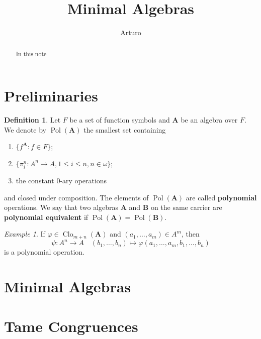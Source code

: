 \documentclass{amsart}
\theoremstyle{plain}
\theoremstyle{definition}
\newtheorem{definition}[theorem]{Definition}
\theoremstyle{remark}
\newtheorem{example}[theorem]{Example}
\def\phi{\varphi}
\DeclareMathOperator{\Clo}{Clo}
\DeclareMathOperator{\Pol}{Pol}
\begin{document}
\title{Minimal Algebras}
\author{Arturo}


\begin{abstract}
   In this note 
\end{abstract}

\maketitle 

\section{Preliminaries} 
\begin{definition}
    Let $F$ be a set of function symbols and $\mathbf{A}$ be an algebra over $F$. 
    We denote by $\Pol(\mathbf{A})$ the smallest set containing 
    \begin{enumerate}
        \item $\{f^\mathbf{A}: f \in F\}$; 
        \item $\{\pi^n_i: A^n \to A, 1 \le i \le n, n \in \omega\}$; 
        \item the constant $0$-ary operations
    \end{enumerate}
and closed under composition. 
The elements of $\Pol(\mathbf{A})$ are called \textbf{polynomial} operations. 
We say that two algebras $\mathbf{A}$ and $\mathbf{B}$ on the same carrier are \textbf{polynomial equivalent} if $\Pol(\mathbf{A})=\Pol(\mathbf{B})$. 
\end{definition}


\begin{example}
    If $\phi \in \Clo_{m+n}(\mathbf{A})$ and $(a_1, \ldots, a_m) \in A^m$, then 
    \begin{equation*}
        \psi: A^n \to A \quad (b_1, \ldots, b_n) \mapsto \phi(a_1, \ldots, a_m,b_1, \ldots, b_n)
    \end{equation*}
is a polynomial operation.  
\end{example}

\section{Minimal Algebras}

\section{Tame Congruences}
\end{document}
